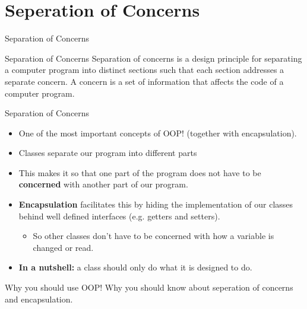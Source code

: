 \section{Seperation of Concerns}

\begin{frame}{Separation of Concerns}
\begin{block}{Separation of Concerns}
Separation of concerns is a design principle for separating a computer program into distinct sections such that each section addresses a separate concern. A concern is a set of information that affects the code of a computer program.
\end{block}
\end{frame}

\begin{frame}{Separation of Concerns}
\begin{itemize}
    \item One of the most important concepts of OOP! (together with encapsulation).
    \item Classes separate our program into different parts
    \item This makes it so that one part of the program does not have to be \textbf{concerned} with another part of our program.
    \item \textbf{Encapsulation} facilitates this by hiding the implementation of our classes behind well defined interfaces (e.g. getters and setters).
    \begin{itemize}
        \pause
        \item So other classes don't have to be concerned with how a variable is changed or read.
    \end{itemize}
    \item \textbf{In a nutshell:} a class should only do what it is designed to do.
\end{itemize}
\end{frame}

\begin{frame}{Why you should use OOP!}
Why you should know about seperation of concerns and encapsulation.
\end{frame}

